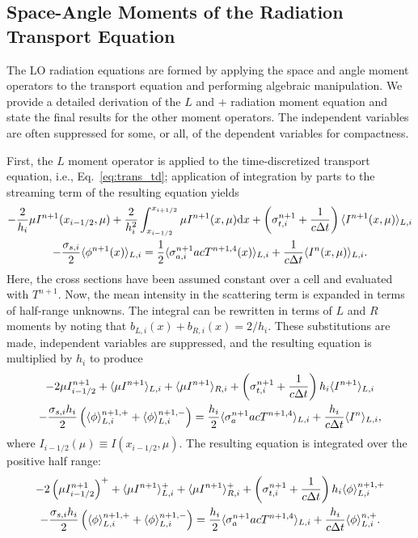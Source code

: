 \subsection{Space-Angle Moments of the Radiation Transport Equation}

The LO radiation equations are formed by applying the space and angle moment operators to the
transport equation and performing algebraic manipulation.  We provide a detailed
derivation of the $L$ and $+$ radiation moment equation and state the final results for the
other moment operators.  The independent variables are often suppressed for some, or
all, of the dependent variables for compactness. 

First, the $L$ moment operator is applied to the time-discretized transport equation,
i.e., Eq.~\eqref{eq:trans_td}; application of integration by parts to the streaming term
of the resulting equation yields
\begin{multline}
    -\frac{2}{h_i}\mu I^{n+1}(x_{i-1/2},\mu) + \frac{2}{h_i^2}\int_{{x_{i-1/2}}}^{{x_{i+1/2}}} \mu I^{n+1}(x,\mu) \mathrm{d} x
        +  \left(\sigma_{t,i}^{n+1}+\frac{1}{c \Delta t} \right)  
        \langle I^{n+1}(x,\mu) \rangle_{L,i} \\ -  \frac{\sigma_{s,i} }{2} \langle \phi^{n+1}(x) \rangle_{L,i} =
        \frac{1}{2} \langle \sigma_{a,i}^{n+1} a c T^{n+1,4}(x) \rangle_{L,i} +
  \frac{1}{c\Delta t}\langle I^n(x,\mu) \rangle_{L,i}.
\end{multline}
Here, the cross sections have been assumed constant over a cell and evaluated with
$T^{n+1}$. Now, the mean
intensity in the scattering term is expanded in terms of half-range unknowns.
The integral can be rewritten in terms of $L$ and $R$ moments by noting that $b_{L,i}(x) +
b_{R,i}(x) = 2/h_i$.  These substitutions are made, independent variables are suppressed, and the resulting equation is
multiplied by $h_i$ to produce
\begin{multline}
    -2\mu I_{i-1/2}^{n+1} + \langle \mu I^{n+1} \rangle_{L,i} + \langle \mu I^{n+1} \rangle_{R,i} 
        +  \left(\sigma_{t,i}^{n+1}+\frac{1}{c \Delta t} \right) h_i 
        \langle I^{n+1} \rangle_{L,i} \\-  \frac{\sigma_{s,i} h_i}{2} \left( \langle \phi \rangle_{L,i}^{n+1,+} +
  \langle \phi \rangle_{L,i}^{n+1,-}\right) = \frac{h_i}{2} \langle \sigma_a^{n+1} a c T^{n+1,4} \rangle_{L,i} +
  \frac{h_i}{c\Delta t}\langle I^n \rangle_{L,i},
\end{multline}
where $I_{i-1/2}(\mu)\equiv I(x_{i-1/2},\mu)$.
The resulting equation is integrated over the positive half range:
\begin{multline}\label{eq:spat_mom}
    -2\left({\mu} I_{i-1/2}^{n+1}\right)^+ + \langle \mu I^{n+1} \rangle^+_{L,i} + \langle \mu
        I^{n+1} \rangle^+_{R,i} 
        +  \left(\sigma_{t,i}^{n+1}+\frac{1}{c \Delta t} \right) h_i 
  \langle \phi \rangle_{L,i}^{n+1,+} \\-  \frac{\sigma_{s,i} h_i}{2} \left( \langle \phi \rangle_{L,i}^{n+1,+} +
  \langle \phi \rangle_{L,i}^{n+1,-}\right) = \frac{h_i}{2} \langle \sigma_a^{n+1} a c T^{n+1,4} \rangle_{L,i} +
  \frac{h_i}{c\Delta t}\langle \phi \rangle_{L,i}^{n,+}.
\end{multline}

